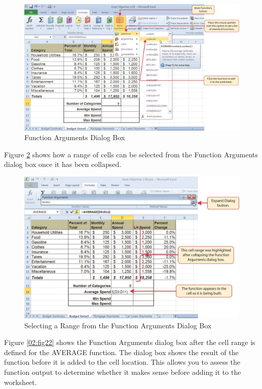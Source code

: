 \begin{figure}[H]
	\centering
	\includegraphics[width=\maxwidth{.95\linewidth}]{gfx/ch02_fig20}
	\caption{Function Arguments Dialog Box}
	\label{02:fig20}
\end{figure}

Figure \ref{02:fig21} shows how a range of cells can be selected from the Function Arguments dialog box once it has been collapsed.

\begin{figure}[H]
	\centering
	\includegraphics[width=\maxwidth{.95\linewidth}]{gfx/ch02_fig21}
	\caption{Selecting a Range from the Function Arguments Dialog Box}
	\label{02:fig21}
\end{figure}

Figure \ref{02:fig22} shows the Function Arguments dialog box after the cell range is defined for the AVERAGE function. The dialog box shows the result of the function before it is added to the cell location. This allows you to assess the function output to determine whether it makes sense before adding it to the worksheet.

